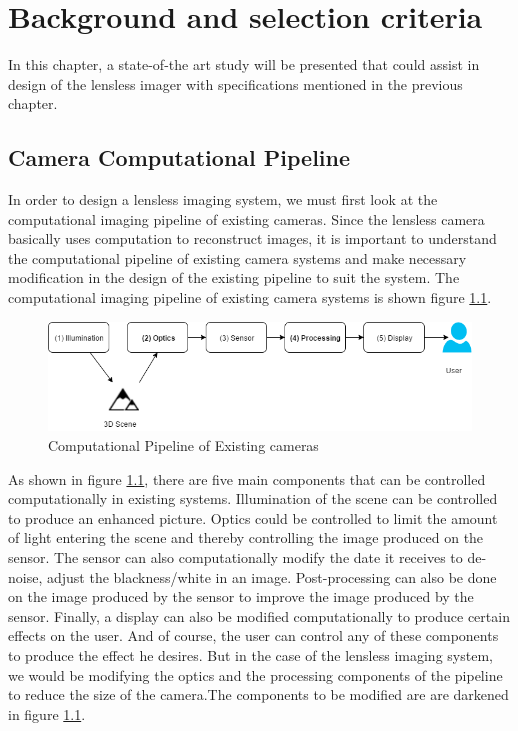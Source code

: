 \chapter{Background and selection criteria}
\label{chp:LitSurvey}
In this chapter, a state-of-the art study will be presented that could assist in design of the lensless imager with specifications mentioned in the previous chapter.
\section{Camera Computational Pipeline}
In order to design a lensless imaging system, we must first look at the computational imaging pipeline of existing cameras. Since the lensless camera basically uses computation to reconstruct images, it is important to understand the computational pipeline of existing camera systems and make necessary modification in the design of the existing pipeline to suit the system. The computational imaging pipeline of existing camera systems is shown figure \ref{fig:CompPipeline}\cite{CompPipeline}.
\begin{figure}[htb]
\includegraphics[width=\textwidth]{pics/CompPipeline}
\caption{Computational Pipeline of Existing cameras}
\label{fig:CompPipeline}
\end{figure}
As shown in figure \ref{fig:CompPipeline}, there are five main components that can be controlled computationally in existing systems. Illumination of the scene can be controlled to produce an enhanced picture. Optics could be controlled to limit the amount of light entering the scene and thereby controlling the image produced on the sensor. The sensor can also computationally modify the date it receives to de-noise, adjust the blackness/white in an image. Post-processing can also be done on the image produced by the sensor to improve the image produced by the sensor. Finally, a display can also be modified computationally to produce certain effects on the user. And of course, the user can control any of these components to produce the effect he desires. But in the case of the lensless imaging system, we would be modifying the optics and the processing components of the pipeline to reduce the size of the camera.The components to be modified are are darkened in figure \ref{fig:CompPipeline}. 

